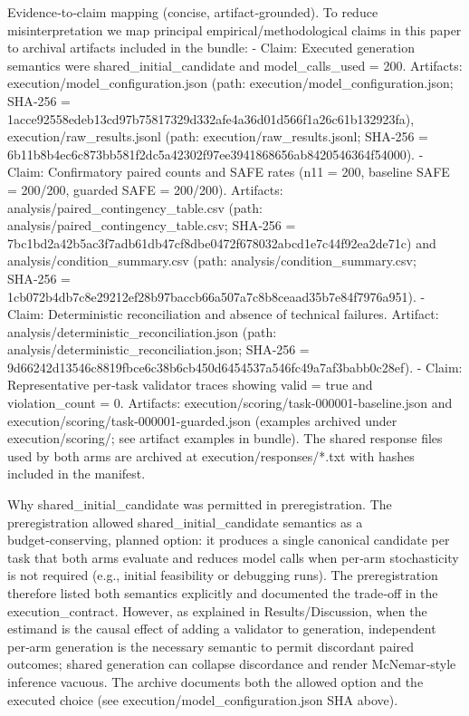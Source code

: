 \documentclass[conference]{IEEEtran}
\begin{document}
Evidence‑to‑claim mapping (concise, artifact‑grounded). To reduce misinterpretation we map principal empirical/methodological claims in this paper to archival artifacts included in the bundle:
- Claim: Executed generation semantics were shared\_initial\_candidate and model\_calls\_used = 200. Artifacts: execution/model\_configuration.json (path: execution/model\_configuration.json; SHA‑256 = 1acce92558edeb13cd97b75817329d332afe4a36d01d566f1a26c61b132923fa), execution/raw\_results.jsonl (path: execution/raw\_results.jsonl; SHA‑256 = 6b11b8b4ec6c873bb581f2dc5a42302f97ee3941868656ab8420546364f54000).
- Claim: Confirmatory paired counts and SAFE rates (n11 = 200, baseline SAFE = 200/200, guarded SAFE = 200/200). Artifacts: analysis/paired\_contingency\_table.csv (path: analysis/paired\_contingency\_table.csv; SHA‑256 = 7bc1bd2a42b5ac3f7adb61db47cf8dbe0472f678032abcd1e7c44f92ea2de71c) and analysis/condition\_summary.csv (path: analysis/condition\_summary.csv; SHA‑256 = 1cb072b4db7c8e29212ef28b97baccb66a507a7c8b8ceaad35b7e84f7976a951).
- Claim: Deterministic reconciliation and absence of technical failures. Artifact: analysis/deterministic\_reconciliation.json (path: analysis/deterministic\_reconciliation.json; SHA‑256 = 9d66242d13546c8819fbce6c38b6cb450d6454537a546fc49a7af3babb0c28ef).
- Claim: Representative per‑task validator traces showing valid = true and violation\_count = 0. Artifacts: execution/scoring/task-000001-baseline.json and execution/scoring/task-000001-guarded.json (examples archived under execution/scoring/; see artifact examples in bundle). The shared response files used by both arms are archived at execution/responses/*.txt with hashes included in the manifest.

Why shared\_initial\_candidate was permitted in preregistration. The preregistration allowed shared\_initial\_candidate semantics as a budget‑conserving, planned option: it produces a single canonical candidate per task that both arms evaluate and reduces model calls when per‑arm stochasticity is not required (e.g., initial feasibility or debugging runs). The preregistration therefore listed both semantics explicitly and documented the trade‑off in the execution\_contract. However, as explained in Results/Discussion, when the estimand is the causal effect of adding a validator to generation, independent per‑arm generation is the necessary semantic to permit discordant paired outcomes; shared generation can collapse discordance and render McNemar‑style inference vacuous. The archive documents both the allowed option and the executed choice (see execution/model\_configuration.json SHA above).
\end{document}
